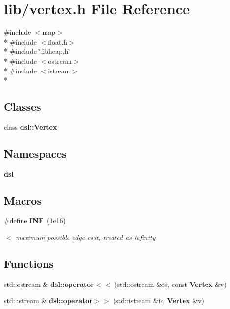 \section{lib/vertex.h File Reference}
\label{lib_2vertex_8h}
{\ttfamily \#include $<$map$>$}\\*
{\ttfamily \#include $<$float.\-h$>$}\\*
{\ttfamily \#include \char`\"{}fibheap.\-h\char`\"{}}\\*
{\ttfamily \#include $<$ostream$>$}\\*
{\ttfamily \#include $<$istream$>$}\\*
\subsection*{Classes}
\begin{DoxyCompactItemize}
\item 
class {\bf dsl\-::\-Vertex}
\end{DoxyCompactItemize}
\subsection*{Namespaces}
\begin{DoxyCompactItemize}
\item 
{\bf dsl}
\end{DoxyCompactItemize}
\subsection*{Macros}
\begin{DoxyCompactItemize}
\item 
\#define {\bf I\-N\-F}~(1e16)
\begin{DoxyCompactList}\small\item\em $<$ maximum possible edge cost, treated as infinity \end{DoxyCompactList}\end{DoxyCompactItemize}
\subsection*{Functions}
\begin{DoxyCompactItemize}
\item 
std\-::ostream \& {\bf dsl\-::operator$<$$<$} (std\-::ostream \&os, const {\bf Vertex} \&v)
\item 
std\-::istream \& {\bf dsl\-::operator$>$$>$} (std\-::istream \&is, {\bf Vertex} \&v)
\end{DoxyCompactItemize}


